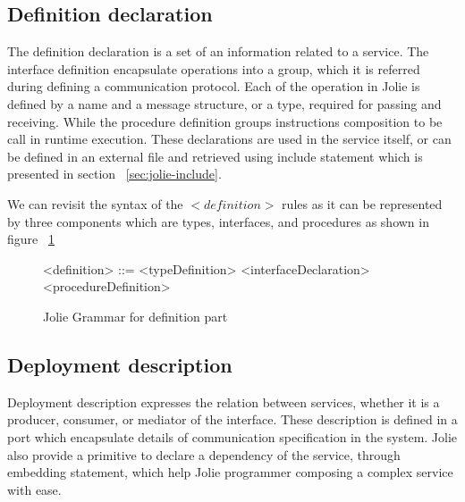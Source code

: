 \FloatBarrier

\subsection{Definition declaration}
\label{sec:jolie-def}

The definition declaration is a set of an information related to a service. The interface definition encapsulate operations into a group, which it is referred during defining a communication protocol. Each of the operation in Jolie is defined by a name and a message structure, or a type, required for passing and receiving. While the procedure definition groups instructions composition to be call in runtime execution. These declarations are used in the service itself, or can be defined in an external file and retrieved using include statement which is presented in section ~\ref{sec:jolie-include}.







We can revisit the syntax of the \(<definition>\) rules as it can be represented by three components which are types, interfaces, and procedures as shown in figure ~\ref{fig:jolie-definition}

\begin{figure}[h]
    \begin{framed}
        \begin{grammar}
            <definition> ::= <typeDefinition>
            \alt <interfaceDeclaration>
            \alt <procedureDefinition>
        \end{grammar}
    \end{framed}
    \caption{Jolie Grammar for definition part}
    \label{fig:jolie-definition}
\end{figure}

\subsection{Deployment description}

Deployment description expresses the relation between services, whether it is a producer, consumer, or mediator of the interface.
These description is defined in a port which encapsulate details of communication specification in the system.
Jolie also provide a primitive to declare a dependency of the service, through embedding statement, which help Jolie programmer composing a complex service with ease.


